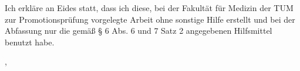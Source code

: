 \thispagestyle{empty}
\vspace*{0.8\textheight}
\noindent
Ich erkläre an Eides statt, dass ich diese, bei der Fakultät für Medizin der TUM zur Promotionsprüfung vorgelegte Arbeit ohne sonstige Hilfe erstellt und bei der Abfassung nur die gemäß § 6 Abs. 6 und 7 Satz 2 angegebenen Hilfsmittel benutzt habe.

\vspace{15mm}
\noindent
\getSubmissionLocation{}, \getSubmissionDate{} \hspace{4cm} \getAuthor{}

\cleardoublepage{}
